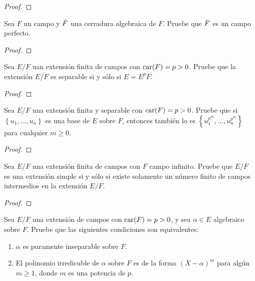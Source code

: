 \documentclass[12pt]{report}
\theoremstyle{largebreak}
\newcommand{\car}[1]{\ensuremath{\textup{car}(#1)}}
\begin{document}
    \begin{proof}
        
    \end{proof}

    \begin{excer}
        Sea $F$ un campo y $\Bar{F}$ una cerradura algebraica de $F$. Pruebe que $\Bar{F}$ es un campo perfecto.
    \end{excer}

    \begin{proof}
        
    \end{proof}

    \begin{excer}
        Sea $E/F$ uan extensión finita de campos con $\car{F}=p>0$. Pruebe que la extensión $E/F$ es separable si y sólo si $E=E^pF$.
    \end{excer}

    \begin{proof}
        
    \end{proof}

    \begin{excer}
        Sea $E/F$ una extensión finita y separable con $\car{F}=p>0$. Pruebe que si $\left\{u_1,...,u_n\right\}$ es una base de $E$ sobre $F$, entonces también lo es $\left\{u_1^{p^m},...,u_n^{p^m}\right\}$ para cualquier $m\geq0$.
    \end{excer}

    \begin{proof}
        
    \end{proof}

    \begin{excer}
        Sea $E/F$ una extensión finita de campos con $F$ campo infinito. Pruebe que $E/F$ es una extensión simple si y sólo si existe solamente un número finito de campos intermedios en la extensión $E/F$.
    \end{excer}

    \begin{proof}
        
    \end{proof}

    \begin{excer}
        Sea $E/F$ una extensión de campos con $\car{F}=p>0$, y sea $\alpha\in E$ algebraico sobre $F$. Pruebe que las siguientes condiciones son equivalentes:
        \renewcommand{\theenumi}{\arabic{enumi})}
        \begin{enumerate}
            \item $\alpha$ es puramente inseparable sobre $F$.
            \item El polinomio irredicuble de $\alpha$ sobre $F$ es de la forma $(X-\alpha)^m$ para algún $m\geq1$, donde $m$ es una potencia de $p$.
        \end{enumerate}
    \end{excer}
\end{document}
